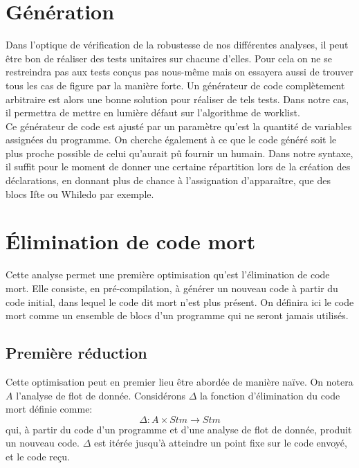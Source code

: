 \documentclass[a4paper, 12pt]{article}
\begin{document}
\section{Génération}
Dans l'optique de vérification de la robustesse de nos différentes analyses, il peut être bon de réaliser
des tests unitaires sur chacune d'elles. Pour cela on ne se restreindra pas aux tests conçus pas nous-même
mais on essayera aussi de trouver tous les cas de figure par la manière forte. Un générateur de code complètement
arbitraire est alors une bonne solution pour réaliser de tels tests. Dans notre cas, il permettra de mettre en
lumière défaut sur l'algorithme de worklist.
\\
Ce générateur de code est ajusté par un paramètre qu'est la quantité de variables assignées du programme. On
cherche également à ce que le code généré soit le plus proche possible de celui qu'aurait pû fournir un humain.
Dans notre syntaxe, il suffit pour le moment de donner une certaine répartition lors de la création des déclarations,
en donnant plus de chance à l'assignation d'apparaître, que des blocs Ifte ou Whiledo par exemple.

\section{Élimination de code mort}
Cette analyse permet une première optimisation qu'est l'élimination de code mort. Elle consiste, en pré-compilation,
à générer un nouveau code à partir du code initial, dans lequel le code dit mort n'est plus présent.
On définira ici le code mort comme un ensemble de blocs d'un programme qui ne seront jamais utilisés.

\subsection{Première réduction}
Cette optimisation peut en premier lieu être abordée de manière naïve. On notera $A$ l'analyse de flot de donnée.
Considérons $\Delta$ la fonction d'élimination du code mort définie comme:
\[\Delta : A \times Stm \longrightarrow Stm\]
qui, à partir du code d'un programme et d'une analyse de flot de donnée, produit un nouveau code. $\Delta$ est itérée
jusqu'à atteindre un point fixe sur le code envoyé, et le code reçu.	
\end{document}
